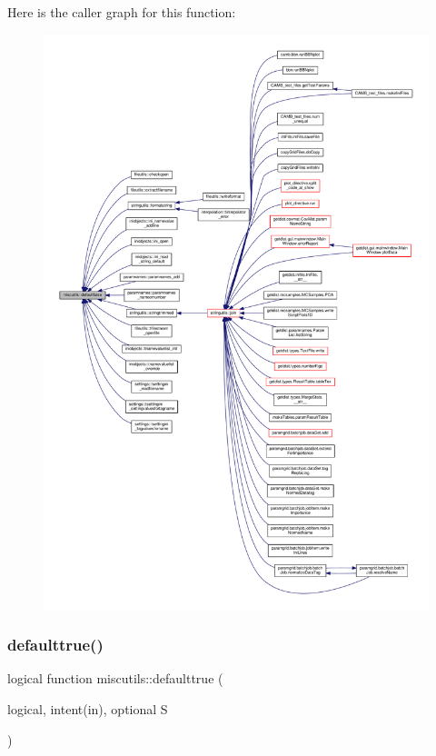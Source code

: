 Here is the caller graph for this function\+:
\nopagebreak
\begin{figure}[H]
\begin{center}
\leavevmode
\includegraphics[width=350pt]{namespacemiscutils_a9337630be33970a7cde8995bd73c58da_icgraph}
\end{center}
\end{figure}
\mbox{\label{namespacemiscutils_a3e4e42b3e3f4fbf064bb2e2b927c5604}} 
\subsubsection{\texorpdfstring{defaulttrue()}{defaulttrue()}}
{\footnotesize\ttfamily logical function miscutils\+::defaulttrue (\begin{DoxyParamCaption}\item[{logical, intent(in), optional}]{S }\end{DoxyParamCaption})}



